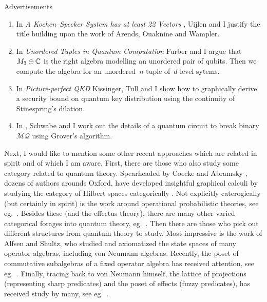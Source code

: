 \documentclass[b]{subfiles}
\begin{document}
\begin{parsec}
\begin{point}{Advertisements}
\begin{enumerate}
    \item In \emph{A Kochen--Specker System has at least 22 Vectors} \cite{uijlen2016kochen},
        Uijlen and I justify the title building upon the work
        of Arends, Ouaknine and Wampler.
\item 
    In \emph{Unordered Tuples in Quantum Computation} \cite{bags}
        Furber and I argue that~$M_3 \oplus \mathbb{C}$ is the right algebra
        modelling an unordered pair of qubits.  Then we compute
        the algebra for an unordered~$n$-tuple of~$d$-level sytems.
\item
    In \emph{Picture-perfect QKD} \cite{kissinger2017picture}
        Kissinger, Tull and I show how to graphically derive a security
        bound on quantum key distribution using the continuity of Stinespring's dilation.
\item
    In \cite{schwabe2016solving}, Schwabe and I
            work out the details of a quantum circuit
            to break binary~$\mathcal{MQ}$ using Grover's algorithm.
\end{enumerate}
Next, I would like to mention some other recent approaches
        which are related in spirit and of which I am aware.
First, there are those who also study some category
    related to quantum theory.
Spearheaded by Coecke and Abramsky \cite{abramsky2004categorical},
    dozens of authors arounds Oxford,
    have developed insightful graphical calculi
    by studying the category of Hilbert spaces
    categorically \cite{coecke2017picturing}.
Not explicitly caterogically (but certainly in spirit)
    is the work around operational probabilistic theories,
    see eg.~\cite{DAriano2016}.
Besides these (and the effectus theory),
    there are many other varied categorical forages
    into quantum theory, eg.~\cite{kornell2012quantum,rennela2017infinite,staton,furber2013kleisli}.
Then there are those who pick out different structures from quantum theory
    to study.
Most impressive is the work of Alfsen and Shultz,
    who studied and axiomatized the state
    spaces of many operator algebras, including von Neumann algebras. \cite{alfsen2012}
Recently, the poset of commutative subalgebras of a fixed operator algebra
    has received attention,
    see eg.~\cite{heunen2015domains,bert,heunen2012bohrification}.
Finally,
    tracing back to von Neumann himself,
    the lattice of projections (representing sharp predicates)
    and the poset of effects (fuzzy predicates),
    has received study by many, see eg.~\cite{dvurecenskij2013new}.
\end{point}

\end{parsec}
\end{document}
